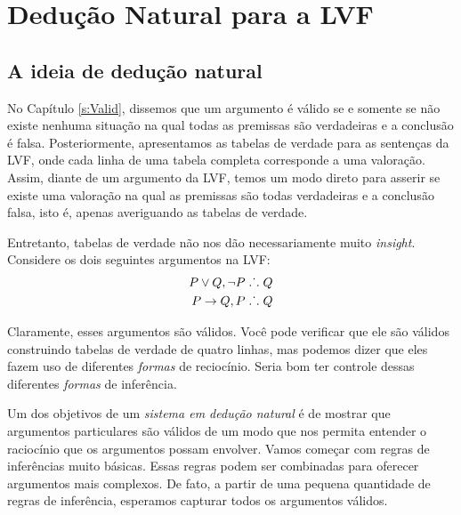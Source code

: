 \part{Dedu\c c\~ao Natural para a LVF}
\label{ch.NDTFL}

\chapter{A ideia de dedu\c c\~ao natural}\label{s:NDVeryIdea}

No  Cap\'itulo  \ref{s:Valid}, dissemos que um argumento \'e v\'alido se e somente se n\~ao existe nenhuma situa\c c\~ao na qual todas as premissas s\~ao verdadeiras e a conclus\~ao \'e falsa. Posteriormente,  apresentamos as tabelas de verdade para as senten\c cas da LVF,  onde  cada linha de uma tabela completa corresponde a uma valora\c c\~ao. Assim, diante de um argumento da LVF,  temos um modo direto para asserir se existe uma valora\c c\~ao na qual as premissas s\~ao todas verdadeiras e a conclus\~ao falsa, isto \'e, apenas averiguando as tabelas de verdade. 

Entretanto, tabelas de verdade n\~ao nos d\~ao necessariamente muito  \emph{insight}. Considere os dois seguintes argumentos na LVF:
\begin{align*}
P \vee Q, \neg P & \mathrel{\ldotp\dot{}\,\ldotp} Q\\
P \rightarrow Q, P & \mathrel{\ldotp\dot{}\,\ldotp} Q
\end{align*}

Claramente, esses argumentos s\~ao v\'alidos. Voc\^e  pode verificar que ele s\~ao v\'alidos construindo tabelas de verdade de quatro linhas, mas podemos dizer que eles fazem uso de diferentes \emph{formas}  de recioc\'inio. Seria bom ter controle dessas diferentes \emph{formas}  de infer\^encia.

Um dos  objetivos de um  \emph{sistema em dedu\c c\~ao natural} \'e de mostrar que argumentos particulares s\~ao  v\'alidos de um modo que nos permita entender o racioc\'inio que os argumentos possam envolver.  Vamos come\c car com regras de infer\^encias muito b\'asicas. Essas regras podem ser combinadas para oferecer  argumentos mais complexos.  De fato,  a partir de uma pequena quantidade  de regras de infer\^encia, esperamos capturar todos os argumentos v\'alidos.


